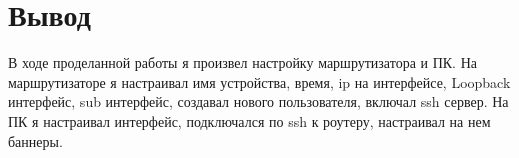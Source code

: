 \chapter{Вывод}
В ходе проделанной работы я произвел настройку маршрутизатора и ПК. На маршрутизаторе я настраивал имя устройства, время,
ip на интерфейсе, Loopback интерфейс, sub интерфейс, создавал нового пользователя, включал ssh сервер. На ПК я настраивал
интерфейс, подключался по ssh к роутеру, настраивал на нем баннеры.
\endinput